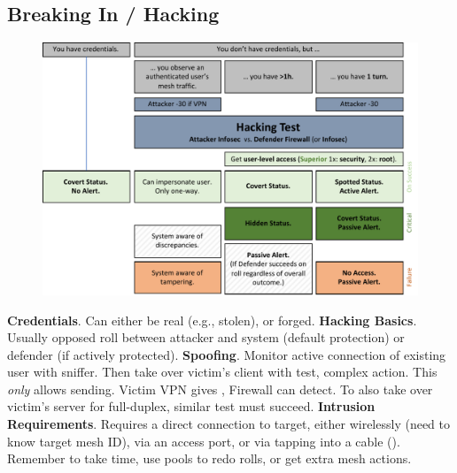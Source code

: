 \subsection*{Breaking In / Hacking}

\begin{figure}[H]%
   \centering
   \includegraphics[scale=0.69]{gfx/mesh-hacking-sequence}%
\end{figure}%


\begin{itemize}
   \itembox \textbf{Credentials}. Can either be real (e.g., stolen), or forged.
   \itembox \textbf{Hacking Basics}. Usually opposed roll between attacker  and system  (default protection) or defender  (if actively protected).
   \itembox \textbf{Spoofing}. Monitor active connection of existing user with sniffer. Then take over victim's client with  test, complex action. This \textit{only} allows sending. Victim VPN gives , Firewall can detect. To also take over victim's server for full-duplex, similar  test must succeed.
   \itembox \textbf{Intrusion Requirements}. Requires a direct connection to target, either wirelessly (need to know target mesh ID), via an access port, or via tapping into a cable ().
   \itembox Remember to take time, use pools to redo rolls, or get extra mesh actions.
\end{itemize}



